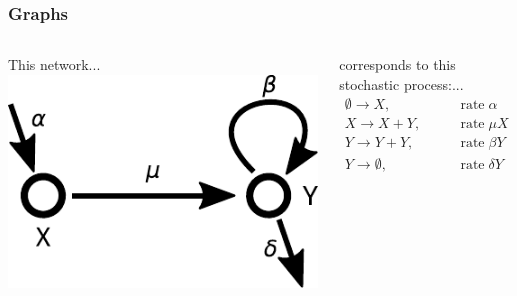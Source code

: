 \documentclass{beamer}
\begin{document}
\begin{frame}
    \frametitle{Graphs}

    \begin{columns}
        \begin{column}{0.6\textwidth}
        This network...
        \includegraphics[width=\textwidth]{figures/diagram1}
        \end{column}
        \begin{column}{0.4\textwidth}
        corresponds to this stochastic process:...
        \begin{align}
            \emptyset \rightarrow X, &\qquad \mathrm{rate\;}\alpha
            \nonumber \\
            X \rightarrow X + Y, &\qquad\mathrm{rate\;}\mu X
            \nonumber \\
            Y \rightarrow Y + Y, &\qquad\mathrm{rate\;} \beta Y
            \nonumber \\
            Y \rightarrow \emptyset, &\qquad\mathrm{rate\;} \delta Y
            \nonumber
        \end{align}
        \end{column}
    \end{columns}



\end{frame}
\end{document}
